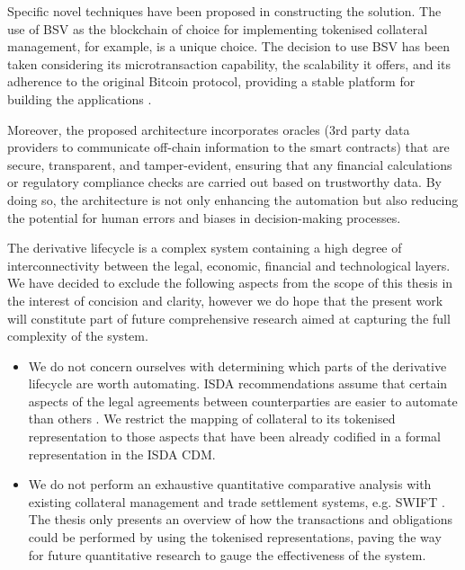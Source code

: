 Specific novel techniques have been proposed in constructing the solution. The use of BSV as the blockchain of choice for implementing tokenised collateral management, for example, is a unique choice. The decision to use BSV has been taken considering its microtransaction capability, the scalability it offers, and its adherence to the original Bitcoin protocol, providing a stable platform for building the applications \citep{coingeek_bsv}.

Moreover, the proposed architecture incorporates oracles (3rd party data providers to communicate off-chain information to the smart contracts) that are secure, transparent, and tamper-evident, ensuring that any financial calculations or regulatory compliance checks are carried out based on trustworthy data. By doing so, the architecture is not only enhancing the automation but also reducing the potential for human errors and biases in decision-making processes.

The derivative lifecycle is a complex system containing a high degree of interconnectivity between the legal, economic, financial and technological layers. We have decided to exclude the following aspects from the scope of this thesis in the interest of concision and clarity, however we do hope that the present work will constitute part of future comprehensive research aimed at capturing the full complexity of the system.

\begin{itemize}
    \item We do not concern ourselves with determining which parts of the derivative lifecycle are worth automating. ISDA recommendations assume that certain aspects of the legal agreements between counterparties are easier to automate than others \citep{clack2019smart}. We restrict the mapping of collateral to its tokenised representation to those aspects that have been already codified in a formal representation in the ISDA CDM. 

    \item We do not perform an exhaustive quantitative comparative analysis with existing collateral management and trade settlement systems, e.g. SWIFT \citep{SWIFT}. The thesis only presents an overview of how the transactions and obligations could be performed by using the tokenised representations, paving the way for future quantitative research to gauge the effectiveness of the system.
    
\end{itemize}